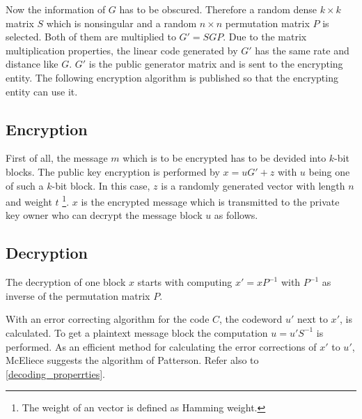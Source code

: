 Now the information of $G$ has to be obscured. Therefore a random dense $k \times k$ matrix $S$ which is nonsingular and a random $n \times n$ permutation matrix $P$ is selected. Both of them are multiplied to $G' = SGP$. Due to the matrix multiplication properties, the linear code generated by $G'$ has the same rate and distance like $G$. $G'$ is the public generator matrix and is sent to the encrypting entity. 
\newline
\newline
The following encryption algorithm is published so that the encrypting entity can use it. 

\subsection*{Encryption}
First of all, the message $m$ which is to be encrypted has to be devided into $k$-bit blocks. The public key encryption is performed by $x = uG' + z$ with $u$ being one of such a $k$-bit block. In this case, $z$ is a randomly generated vector with length $n$ and weight $t$ \footnote{The weight of an vector is defined as Hamming weight.}.
\newline
\newline
$x$ is the encrypted message which is transmitted to the private key owner who can decrypt the message block $u$ as follows. 

\subsection*{Decryption}
The decryption of one block $x$ starts with computing $x' = xP^{-1}$ with $P^{-1}$ as inverse of the permutation matrix $P$. 

With an error correcting algorithm for the code $C$, the codeword $u'$ next to $x'$, is calculated. 
To get a plaintext message block the computation $u = u'S^{-1}$ is performed\cite{wiki:mcelice}\cite{mceliece1978public}.
As an efficient method for calculating the error corrections of $x'$ to $u'$, McEliece suggests the algorithm of Patterson\cite{patterson1975algebraic}. Refer also to \autoref{decoding_properrties}. 



